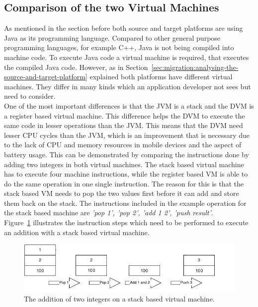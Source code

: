 \subsection{Comparison of the two Virtual Machines}
\label{sec:migration:comparison-of-the-two-virtual-machines}
As mentioned in the section before both source and target platforms are using Java as its programming language.
Compared to other general purpose programming languages, for example C++, Java is not being compiled into machine code.
To execute Java code a virtual machine is required, that executes the compiled Java code.
However, as in Section~\ref{sec:migration:analysing-the-source-and-target-platform} explained both platforms have different virtual machines.
They differ in many kinds which an application developer not sees but need to consider.
\\
One of the most important differences is that the JVM is a stack and the DVM is a register based virtual machine.
This difference helps the DVM to execute the same code in lesser operations than the JVM.
This means that the DVM need lesser CPU cycles than the JVM, which is an improvement that is necessary due to the lack of CPU and memory resources in mobile devices and the aspect of battery usage.
This can be demonstrated by comparing the instructions done by adding two integers in both virtual machines.
The stack based virtual machine has to execute four machine instructions, while the register based VM is able to do the same operation in one single instruction.
The reason for this is that the stack based VM needs to pop the two values first before it can add and store them back on the stack.
The instructions included in the example operation for the stack based machine are \textit{'pop 1', 'pop 2', 'add 1 2', 'push result'}.\\
Figure~\ref{fig:stack-based-addition} illustrates the instruction steps which need to be performed to execute an addition with a stack based virtual machine.
\begin{figure}[h]
\begin{center}
\includegraphics[scale=0.65]{images/stack-based-addition.png} 
\caption{The addition of two integers on a stack based virtual machine.}
\label{fig:stack-based-addition}
\end{center}
\end{figure}
